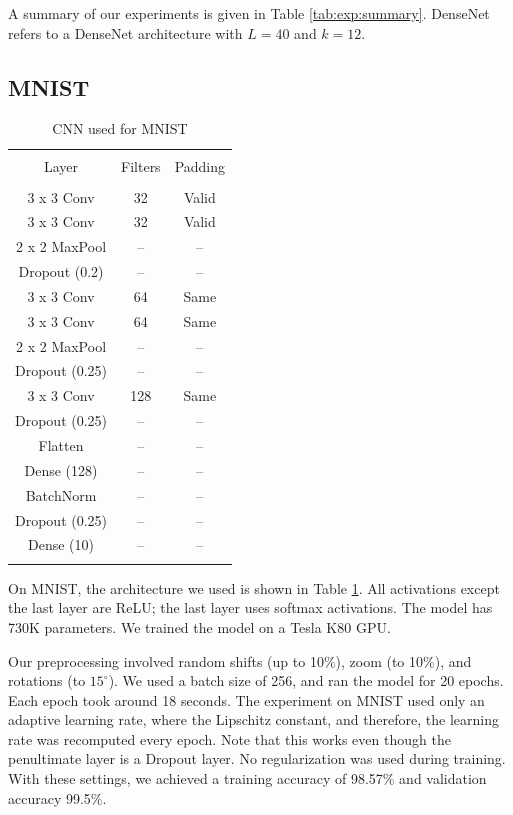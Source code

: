 \documentclass{article}
\begin{document}
A summary of our experiments is given in Table \ref{tab:exp:summary}. DenseNet refers to a DenseNet\cite{huang2017densely} architecture with $L = 40$ and $k = 12$.

\subsection{MNIST}
\begin{table}
    \centering
    \caption{CNN used for MNIST}
    \begin{tabular}{ccc}
        \toprule \\
        Layer & Filters & Padding \\
        \midrule \\
        3 x 3 Conv & 32 & Valid  \\
        3 x 3 Conv & 32 & Valid  \\
        2 x 2 MaxPool & -- & -- \\
        Dropout (0.2) & -- & -- \\
        3 x 3 Conv & 64 & Same \\
        3 x 3 Conv & 64 & Same \\
        2 x 2 MaxPool & -- & -- \\
        Dropout (0.25) & -- & -- \\
        3 x 3 Conv & 128 & Same \\
        Dropout (0.25) & -- & -- \\
        Flatten & -- & -- \\
        Dense (128) & -- & -- \\
        BatchNorm & -- & -- \\
        Dropout (0.25) & -- & -- \\
        Dense (10) & -- & -- \\
        \bottomrule \\
    \end{tabular}
    \label{tab:mnist:1}
\end{table}

On MNIST, the architecture we used is shown in Table \ref{tab:mnist:1}. All activations except the last layer are ReLU; the last layer uses softmax activations. The model has 730K parameters. We trained the model on a Tesla K80 GPU.

Our preprocessing involved random shifts (up to 10\%), zoom (to 10\%), and rotations (to $15^\circ$). We used a batch size of 256, and ran the model for 20 epochs. Each epoch took around 18 seconds. The experiment on MNIST used only an adaptive learning rate, where the Lipschitz constant, and therefore, the learning rate was recomputed every epoch. Note that this works even though the penultimate layer is a Dropout layer. No regularization was used during training. With these settings, we achieved a training accuracy of 98.57\% and validation accuracy 99.5\%. 
\end{document}
